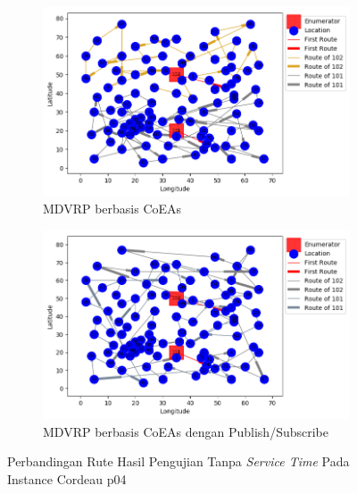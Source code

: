 \begin{figure}[H]
	\centering
	\begin{subfigure}[t]{\textwidth}
		\centering
		\includegraphics[width=\textwidth]{Resources/Images/cordeau_p04/cordeau_p04_notw_coes}
		\caption{MDVRP berbasis CoEAs}
		\label{fig:cordeau_p04_notw_coes}
	\end{subfigure}
	\begin{subfigure}[t]{\textwidth}
		\centering
		\includegraphics[width=\textwidth]{Resources/Images/cordeau_p04/cordeau_p04_notw_pubsub_coes}
		\caption{MDVRP berbasis CoEAs dengan Publish/Subscribe}
		\label{fig:cordeau_p04_notw_pubsub_coes}
	\end{subfigure}
	\caption{Perbandingan Rute Hasil Pengujian Tanpa \textit{Service Time} Pada Instance Cordeau p04}
	\label{fig:cordeau_p04_notw}
\end{figure}


